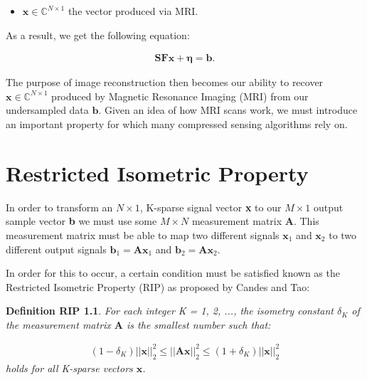 \documentclass[titlepage,oneside, 12pt]{book}
\theoremstyle{break}
\begin{document}
\begin{itemize}
\item $\textbf{x} \in \mathbb{C}^{N \times 1}$ the vector produced via MRI. 
\end{itemize}
As a result, we get the following equation: 

\begin{equation}
\begin{gathered}
\pmb{SF}\textbf{x} + \pmb{\eta} = \textbf{b}.
\end{gathered}
\end{equation}

The purpose of image reconstruction then becomes our ability to recover   $\textbf{x} \in \mathbb{C}^{N \times 1}$  produced by Magnetic Resonance Imaging (MRI) from our undersampled data $\textbf{b}$\cite{MRImodel}. Given an idea of how MRI scans work, we must introduce an important property for which many compressed sensing algorithms rely on. 

\newpage

\chapter{Restricted Isometric Property}

In order to transform an $N \times 1$, K-sparse signal vector \textbf{x} to our $ M \times 1 $ output sample vector \textbf{b} we must use some  $ M \times N$ measurement matrix \textbf{A}. This measurement matrix must be able to map two different signals $ \textbf{x}_{1} $ and $ \textbf{x}_{2} $ to two different output signals $ \textbf{b}_{1} = \textbf{Ax}_{1} $ and $ \textbf{b}_{2} = \textbf{Ax}_{2} $.  

In order for this to occur, a certain condition must be satisfied known as the Restricted Isometric Property (RIP) as proposed by Candes and Tao\cite{ICS}:

\newtheorem*{RIP}{Definition RIP}
\begin{RIP}
For each integer K = 1, 2, ..., the isometry constant $\delta_{K}$ of the measurement matrix $\textbf{A}$ is the smallest number such that:

\begin{equation}
\begin{gathered}
(1 - \delta_{K})||\textbf{x}||_{2}^2 \leq ||\textbf{Ax}||_{2}^{2} \leq (1 + \delta_{K})||\textbf{x}||_{2}^{2}
\end{gathered}
\label{eqn:RIP}
\end{equation}
holds for all K-sparse vectors $\textbf{x}$.
\end{RIP}
\end{document}
